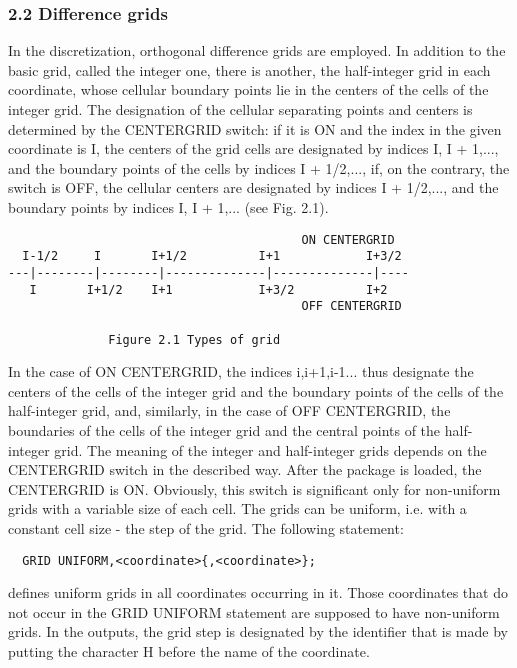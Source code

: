 \subsubsection{2.2 Difference grids}


     In the discretization, orthogonal  difference  grids  are employed.
In addition to the basic grid, called the integer one, there is another,
the half-integer grid in each coordinate, whose cellular boundary points
lie in  the centers of the cells of the integer grid. The designation of
the  cellular  separating  points  and  centers  is  determined  by  the
CENTERGRID switch:  if it is ON and the index in the given coordinate is
I, the centers of the grid cells are designated by indices I, I + 1,...,
and the  boundary points of the cells by indices I + 1/2,..., if, on the
contrary, the switch is OFF,  the  cellular  centers  are  designated by
indices I  + 1/2,...,  and the  boundary points  by indices I, I + 1,...
(see Fig. 2.1).
\begin{verbatim}
                                         ON CENTERGRID
  I-1/2     I       I+1/2          I+1            I+3/2
---|--------|--------|--------------|--------------|----
   I       I+1/2    I+1            I+3/2          I+2
                                         OFF CENTERGRID

              Figure 2.1 Types of grid
\end{verbatim}
In the case of  ON CENTERGRID,  the indices  i,i+1,i-1... thus designate
the centers  of the cells of the integer grid and the boundary points of
the cells of the half-integer grid, and, similarly,  in the  case of OFF
CENTERGRID,  the  boundaries  of  the  cells of the integer grid and the
central points of the half-integer grid. The meaning of the  integer and
half-integer  grids  depends  on  the CENTERGRID switch in the described
way. After the package is loaded, the CENTERGRID is ON.  Obviously, this
switch is significant only for non-uniform grids with a variable size of
each cell.
     The grids can be uniform, i.e. with a constant cell size - the step
of the grid. The following statement:
\begin{verbatim}
  GRID UNIFORM,<coordinate>{,<coordinate>};
\end{verbatim}
defines  uniform  grids  in  all  coordinates  occurring  in  it.  Those
coordinates that do not occur in the GRID UNIFORM statement are supposed
to have non-uniform grids.
     In the  outputs, the grid step is designated by the identifier that
is made by putting the character  H before  the name  of the coordinate.
